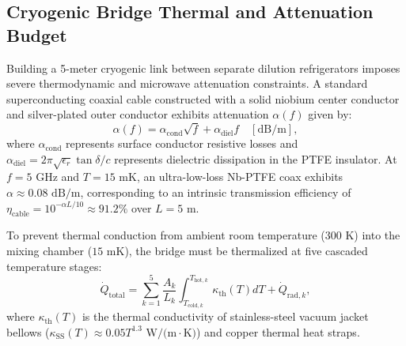 \subsection{Cryogenic Bridge Thermal and Attenuation Budget}
Building a 5-meter cryogenic link between separate dilution refrigerators imposes severe thermodynamic and microwave attenuation constraints. A standard superconducting coaxial cable constructed with a solid niobium center conductor and silver-plated outer conductor exhibits attenuation $\alpha(f)$ given by:
\begin{equation}
    \alpha(f) = \alpha_{\text{cond}} \sqrt{f} + \alpha_{\text{diel}} f \quad [\text{dB/m}],
\end{equation}
where $\alpha_{\text{cond}}$ represents surface conductor resistive losses and $\alpha_{\text{diel}} = 2\pi \sqrt{\epsilon_r} \tan \delta / c$ represents dielectric dissipation in the PTFE insulator. At $f = 5\text{ GHz}$ and $T = 15\text{ mK}$, an ultra-low-loss Nb-PTFE coax exhibits $\alpha \approx 0.08\text{ dB/m}$, corresponding to an intrinsic transmission efficiency of $\eta_{\text{cable}} = 10^{-\alpha L / 10} \approx 91.2\%$ over $L = 5\text{ m}$.

To prevent thermal conduction from ambient room temperature ($300\text{ K}$) into the mixing chamber ($15\text{ mK}$), the bridge must be thermalized at five cascaded temperature stages:
\begin{equation}
    \dot{Q}_{\text{total}} = \sum_{k=1}^{5} \frac{A_k}{L_k} \int_{T_{\text{cold}, k}}^{T_{\text{hot}, k}} \kappa_{\text{th}}(T) dT + \dot{Q}_{\text{rad}, k},
\end{equation}
where $\kappa_{\text{th}}(T)$ is the thermal conductivity of stainless-steel vacuum jacket bellows ($\kappa_{\text{SS}}(T) \approx 0.05 T^{1.3}\text{ W/(m}\cdot\text{K)}$) and copper thermal heat straps. 

